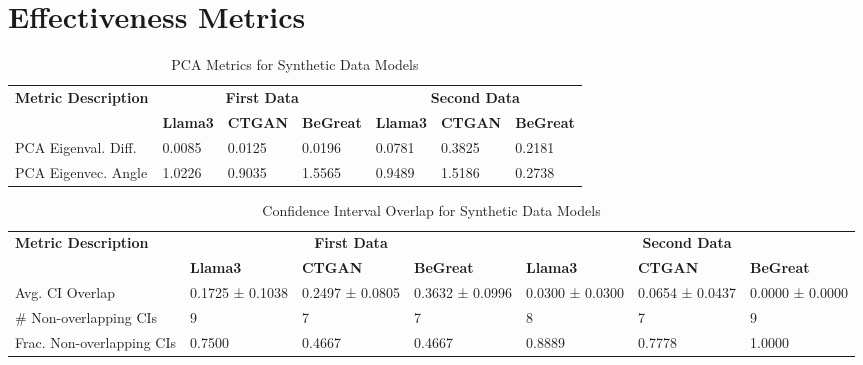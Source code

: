 \chapter*{Effectiveness Metrics}
\label{app:effectiveness_metrics_appendix}







\begin{table}[H]
    \centering
    \caption{PCA Metrics for Synthetic Data Models}
    \label{tab:pca_metrics_combined}
    \begin{tabularx}{\textwidth}{l*{6}{X}}
        \toprule
        \textbf{Metric Description} & \multicolumn{3}{c}{\textbf{First Data}} & \multicolumn{3}{c}{\textbf{Second Data}} \\
        \cmidrule(lr){2-4} \cmidrule(lr){5-7}
        & \textbf{Llama3} & \textbf{CTGAN} & \textbf{BeGreat} & \textbf{Llama3} & \textbf{CTGAN} & \textbf{BeGreat} \\
        \midrule
        PCA Eigenval. Diff. & 0.0085 & 0.0125 & 0.0196 & 0.0781 & 0.3825 & 0.2181 \\
        PCA Eigenvec. Angle & 1.0226 & 0.9035 & 1.5565 & 0.9489 & 1.5186 & 0.2738 \\
        \bottomrule
    \end{tabularx}
\end{table}
    


\begin{table}[H]
    \centering
    \caption{Confidence Interval Overlap for Synthetic Data Models}
    \label{tab:ci_overlap_combined}
    \begin{tabularx}{\textwidth}{l*{6}{X}}
        \toprule
        \textbf{Metric Description} & \multicolumn{3}{c}{\textbf{First Data}} & \multicolumn{3}{c}{\textbf{Second Data}} \\
        \cmidrule(lr){2-4} \cmidrule(lr){5-7}
        & \textbf{Llama3} & \textbf{CTGAN} & \textbf{BeGreat} & \textbf{Llama3} & \textbf{CTGAN} & \textbf{BeGreat} \\
        \midrule
        Avg. CI Overlap & 0.1725 ± 0.1038 & 0.2497 ± 0.0805 & 0.3632 ± 0.0996 & 0.0300 ± 0.0300 & 0.0654 ± 0.0437 & 0.0000 ± 0.0000 \\
        \# Non-overlapping CIs & 9 & 7 & 7 & 8 & 7 & 9 \\
        Frac. Non-overlapping CIs & 0.7500 & 0.4667 & 0.4667 & 0.8889 & 0.7778 & 1.0000 \\
        \bottomrule
    \end{tabularx}
\end{table}


